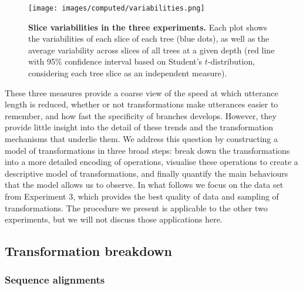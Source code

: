 \begin{figure}[!ht]
  \centering
  \texttt{[image: images/computed/variabilities.png]}
  \caption[Slice variabilities in the three experiments]{
  \textbf{Slice variabilities in the three experiments.}
  Each plot shows the variabilities of each slice of each tree (blue dots), as well as the average variability across slices of all trees at a given depth (red line with 95\% confidence interval based on Student's $t$-distribution, considering each tree slice as an independent measure).
  }
  \label{fig:gistr-variabilities}
\end{figure}

These three measures provide a coarse view of the speed at which
utterance length is reduced, whether or not transformations make
utterances easier to remember, and how fast the specificity of branches
develops. However, they provide little insight into the detail of these
trends and the transformation mechanisms that underlie them. We address
this question by constructing a model of transformations in three broad
steps: break down the transformations into a more detailed encoding of
operations, visualise these operations to create a descriptive model of
transformations, and finally quantify the main behaviours that the model
allows us to observe. In what follows we focus on the data set from
Experiment 3, which provides the best quality of data and sampling of
transformations. The procedure we present is applicable to the other two
experiments, but we will not discuss those applications here.

\subsection{Transformation breakdown}\label{transformation-breakdown}

\subsubsection{Sequence alignments}\label{sequence-alignments}

